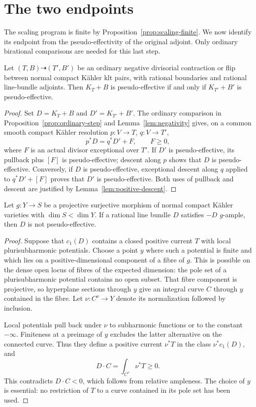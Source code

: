\section{The two endpoints}\label{sec:endpoints}

The scaling program is finite by Proposition~\ref{prop:scaling-finite}.
We now identify its endpoint from the pseudo-effectivity of the original
adjoint.  Only ordinary birational comparisons are needed for this last step.

\begin{lemma}\label{lem:pe-step}
Let $(T,B)\dashrightarrow(T',B')$ be an ordinary negative divisorial
contraction or flip between normal compact Kähler klt pairs, with rational
boundaries and rational line-bundle adjoints.  Then $K_T+B$ is pseudo-effective if
and only if $K_{T'}+B'$ is pseudo-effective.
\end{lemma}

\begin{proof}
Set $D=K_T+B$ and $D'=K_{T'}+B'$.  The ordinary comparison in
Proposition~\ref{prop:ordinary-step} and Lemma~\ref{lem:negativity} gives,
on a common smooth compact Kähler resolution $p:V\to T$, $q:V\to T'$,
\[
 p^*D=q^*D'+F,\qquad F\geq0,
\]
where $F$ is an actual divisor exceptional over $T'$.
If $D'$ is pseudo-effective, its pullback plus $[F]$ is pseudo-effective;
descent along $p$ shows that $D$ is pseudo-effective.
Conversely, if $D$ is pseudo-effective, exceptional descent along $q$
applied to $q^*D'+[F]$ proves that $D'$ is pseudo-effective.
Both uses of pullback and descent are justified by
Lemma~\ref{lem:positive-descent}.
\end{proof}

\begin{lemma}\label{lem:mori-not-pe}
Let $g:Y\to S$ be a projective surjective morphism of normal compact Kähler
varieties with $\dim S<\dim Y$.  If a rational line bundle $D$ satisfies
$-D$ $g$-ample, then $D$ is not pseudo-effective.
\end{lemma}

\begin{proof}
Suppose that $c_1(D)$ contains a closed positive current $T$ with local
plurisubharmonic potentials.  Choose a point $y$ where such a potential is
finite and which lies on a positive-dimensional component of a fibre of
$g$.  This is possible on the dense open locus of fibres of the expected
dimension: the pole set of a plurisubharmonic potential contains no open
subset.  That fibre component is projective, so hyperplane sections through
$y$ give an integral curve $C$ through $y$ contained in the fibre.
Let $\nu:C^\nu\to Y$ denote its normalization followed by inclusion.

Local potentials pull back under $\nu$ to subharmonic functions or to the
constant $-\infty$.  Finiteness at a preimage of $y$ excludes the latter
alternative on the connected curve.  Thus they define a positive current
$\nu^*T$ in the class $\nu^*c_1(D)$, and
\[
 D\cdot C=\int_{C^\nu}\nu^*T\geq0.
\]
This contradicts $D\cdot C<0$, which follows from relative ampleness.
The choice of $y$ is essential: no restriction of $T$ to a curve contained
in its pole set has been used.
\end{proof}

